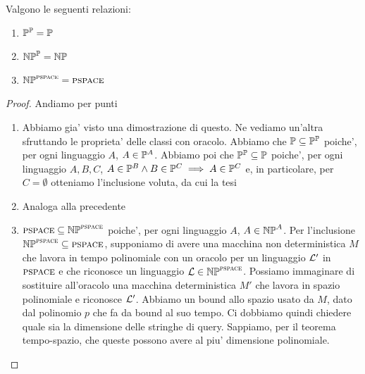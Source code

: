\begin{thm}
    Valgono le seguenti relazioni:
    \begin{enumerate}
        \item $\mathbb{P}^{\mathbb{P}} = \mathbb{P}$
        \item $\mathbb{NP}^{\mathbb{P}} = \mathbb{NP}$
        \item $\mathbb{NP}^{\textsc{pspace}} = \textsc{pspace}$
    \end{enumerate}
\end{thm}
\begin{proof}
    Andiamo per punti
        \begin{enumerate}
                \item Abbiamo gia' visto una dimostrazione di questo. Ne vediamo un'altra sfruttando
                    le proprieta' delle classi con oracolo. Abbiamo che $\mathbb{P} \subseteq
                    \mathbb{P}^{\mathbb{P}}$ poiche', per ogni linguaggio $A$, $A \in \mathbb{P}^{A}$.
                    Abbiamo poi che $\mathbb{P}^{\mathbb{P}} \subseteq \mathbb{P}$ poiche', per ogni
                    linguaggio $A,B,C$, $A \in \mathbb{P}^{B} \land B \in \mathbb{P}^{C} \implies A \in
                    \mathbb{P}^{C}$ e, in particolare, per $C = \emptyset$ otteniamo l'inclusione
                    voluta, da cui la tesi
                \item Analoga alla precedente
                \item $\textsc{pspace} \subseteq \mathbb{NP}^{\textsc{pspace}}$ poiche', per ogni linguaggio $A$, $A
                    \in \mathbb{NP}^{A}$. Per l'inclusione $\mathbb{NP}^{\textsc{pspace}} \subseteq \textsc{pspace}$,
                    supponiamo di avere una macchina non deterministica $M$ che lavora in tempo
                    polinomiale con un oracolo per un linguaggio $\mathcal{L}'$ in $\textsc{pspace}$ e che
                    riconosce un linguaggio $\mathcal{L} \in \mathbb{NP}^{\textsc{pspace}}$.  Possiamo immaginare di
                    sostituire all'oracolo una macchina deterministica $M'$ che lavora in spazio
                    polinomiale e riconosce $\mathcal{L}'$. Abbiamo un bound allo spazio usato da $M$,
                    dato dal polinomio $p$ che fa da bound al suo tempo.  Ci dobbiamo quindi
                    chiedere quale sia la dimensione delle stringhe di query.  Sappiamo, per il
                    teorema tempo-spazio, che queste possono avere al piu' dimensione polinomiale. 


\end{enumerate}
\end{proof}
